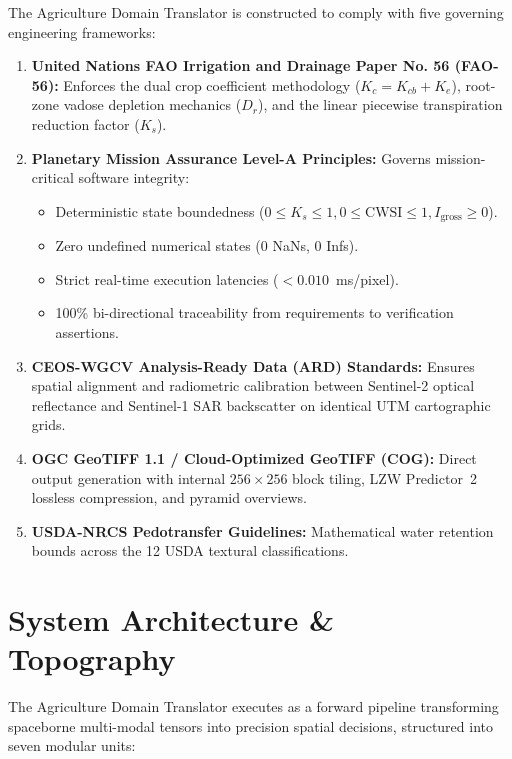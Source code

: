 \documentclass[11pt,a4paper]{article}
\theoremstyle{definition}
\theoremstyle{remark}
\begin{document}
The Agriculture Domain Translator is constructed to comply with five governing engineering frameworks:
\begin{enumerate}
    \item \textbf{United Nations FAO Irrigation and Drainage Paper No. 56 (FAO-56):} Enforces the dual crop coefficient methodology ($K_c = K_{cb} + K_e$), root-zone vadose depletion mechanics ($D_r$), and the linear piecewise transpiration reduction factor ($K_s$).
    \item \textbf{Planetary Mission Assurance Level-A Principles:} Governs mission-critical software integrity:
    \begin{itemize}
        \item Deterministic state boundedness ($0 \le K_s \le 1, 0 \le \text{CWSI} \le 1, I_{\text{gross}} \ge 0$).
        \item Zero undefined numerical states (0 NaNs, 0 Infs).
        \item Strict real-time execution latencies ($< 0.010$~ms/pixel).
        \item 100\% bi-directional traceability from requirements to verification assertions.
    \end{itemize}
    \item \textbf{CEOS-WGCV Analysis-Ready Data (ARD) Standards:} Ensures spatial alignment and radiometric calibration between Sentinel-2 optical reflectance and Sentinel-1 SAR backscatter on identical UTM cartographic grids.
    \item \textbf{OGC GeoTIFF 1.1 / Cloud-Optimized GeoTIFF (COG):} Direct output generation with internal $256 \times 256$ block tiling, LZW Predictor~2 lossless compression, and pyramid overviews.
    \item \textbf{USDA-NRCS Pedotransfer Guidelines:} Mathematical water retention bounds across the 12 USDA textural classifications.
\end{enumerate}


\section{System Architecture \& Topography}

The Agriculture Domain Translator executes as a forward pipeline transforming spaceborne multi-modal tensors into precision spatial decisions, structured into seven modular units:
\end{document}
